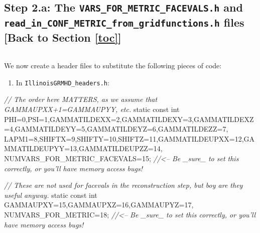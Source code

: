 \documentclass[landscape,letterpaper,10pt,english]{article}
\providecommand{\tightlist}{%
      \setlength{\itemsep}{0pt}\setlength{\parskip}{0pt}}
\newenvironment{Shaded}{}{}
\newcommand{\DataTypeTok}[1]{\textcolor[rgb]{0.56,0.13,0.00}{{#1}}}
\newcommand{\DecValTok}[1]{\textcolor[rgb]{0.25,0.63,0.44}{{#1}}}
\newcommand{\CommentTok}[1]{\textcolor[rgb]{0.38,0.63,0.69}{\textit{{#1}}}}
\newcommand{\NormalTok}[1]{{#1}}
\begin{document}
    \subsection{\texorpdfstring{Step 2.a: The
\texttt{VARS\_FOR\_METRIC\_FACEVALS.h} and
\texttt{read\_in\_CONF\_METRIC\_from\_gridfunctions.h} files {[}Back to
Section \ref{toc}{]}}{Step 2.a: The VARS\_FOR\_METRIC\_FACEVALS.h and read\_in\_CONF\_METRIC\_from\_gridfunctions.h files {[}Back to {]}}}\label{step-2.a-the-vars_for_metric_facevals.h-and-read_in_conf_metric_from_gridfunctions.h-files-back-to-top}

\[\label{read_in_conf_metric_vars}\]

We now create a header files to substitute the following pieces of code:

\begin{enumerate}
\def\labelenumi{\arabic{enumi}.}
\tightlist
\item
  In \texttt{IllinoisGRMHD\_headers.h}:
\end{enumerate}

\begin{Shaded}
\begin{Highlighting}[]
\CommentTok{// The order here MATTERS, as we assume that GAMMAUPXX+1=GAMMAUPYY, etc.}
\DataTypeTok{static} \DataTypeTok{const} \DataTypeTok{int}\NormalTok{ PHI=}\DecValTok{0}\NormalTok{,PSI=}\DecValTok{1}\NormalTok{,GAMMATILDEXX=}\DecValTok{2}\NormalTok{,GAMMATILDEXY=}\DecValTok{3}\NormalTok{,GAMMATILDEXZ=}\DecValTok{4}\NormalTok{,GAMMATILDEYY=}\DecValTok{5}\NormalTok{,GAMMATILDEYZ=}\DecValTok{6}\NormalTok{,GAMMATILDEZZ=}\DecValTok{7}\NormalTok{,}
\NormalTok{  LAPM1=}\DecValTok{8}\NormalTok{,SHIFTX=}\DecValTok{9}\NormalTok{,SHIFTY=}\DecValTok{10}\NormalTok{,SHIFTZ=}\DecValTok{11}\NormalTok{,GAMMATILDEUPXX=}\DecValTok{12}\NormalTok{,GAMMATILDEUPYY=}\DecValTok{13}\NormalTok{,GAMMATILDEUPZZ=}\DecValTok{14}\NormalTok{,}
\NormalTok{  NUMVARS_FOR_METRIC_FACEVALS=}\DecValTok{15}\NormalTok{; }\CommentTok{//<-- Be _sure_ to set this correctly, or you'll have memory access bugs!}

\CommentTok{// These are not used for facevals in the reconstruction step, but boy are they useful anyway. }
\DataTypeTok{static} \DataTypeTok{const} \DataTypeTok{int}\NormalTok{ GAMMAUPXY=}\DecValTok{15}\NormalTok{,GAMMAUPXZ=}\DecValTok{16}\NormalTok{,GAMMAUPYZ=}\DecValTok{17}\NormalTok{,}
\NormalTok{  NUMVARS_FOR_METRIC=}\DecValTok{18}\NormalTok{; }\CommentTok{//<-- Be _sure_ to set this correctly, or you'll have memory access bugs!}
\end{Highlighting}
\end{Shaded}
\end{document}
